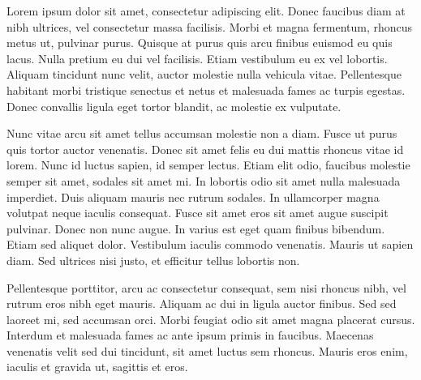 Lorem ipsum dolor sit amet, consectetur adipiscing elit. Donec faucibus diam at nibh ultrices, vel consectetur massa facilisis. Morbi et magna fermentum, rhoncus metus ut, pulvinar purus. Quisque at purus quis arcu finibus euismod eu quis lacus. Nulla pretium eu dui vel facilisis. Etiam vestibulum eu ex vel lobortis. Aliquam tincidunt nunc velit, auctor molestie nulla vehicula vitae. Pellentesque habitant morbi tristique senectus et netus et malesuada fames ac turpis egestas. Donec convallis ligula eget tortor blandit, ac molestie ex vulputate.

Nunc vitae arcu sit amet tellus accumsan molestie non a diam. Fusce ut purus quis tortor auctor venenatis. Donec sit amet felis eu dui mattis rhoncus vitae id lorem. Nunc id luctus sapien, id semper lectus. Etiam elit odio, faucibus molestie semper sit amet, sodales sit amet mi. In lobortis odio sit amet nulla malesuada imperdiet. Duis aliquam mauris nec rutrum sodales. In ullamcorper magna volutpat neque iaculis consequat. Fusce sit amet eros sit amet augue suscipit pulvinar. Donec non nunc augue. In varius est eget quam finibus bibendum. Etiam sed aliquet dolor. Vestibulum iaculis commodo venenatis. Mauris ut sapien diam. Sed ultrices nisi justo, et efficitur tellus lobortis non.

Pellentesque porttitor, arcu ac consectetur consequat, sem nisi rhoncus nibh, vel rutrum eros nibh eget mauris. Aliquam ac dui in ligula auctor finibus. Sed sed laoreet mi, sed accumsan orci. Morbi feugiat odio sit amet magna placerat cursus. Interdum et malesuada fames ac ante ipsum primis in faucibus. Maecenas venenatis velit sed dui tincidunt, sit amet luctus sem rhoncus. Mauris eros enim, iaculis et gravida ut, sagittis et eros.